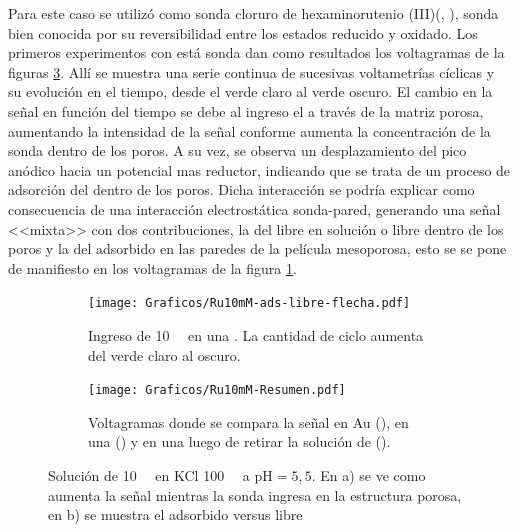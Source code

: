 		Para este caso se utilizó como sonda cloruro de hexaminorutenio (III)\linebreak (\aminorutenioCompleto, \ru), sonda bien conocida por su reversibilidad entre los estados reducido y oxidado. Los primeros experimentos con está sonda dan como resultados los voltagramas de la figuras \ref{fig:primero-Ru10mM}. Allí se muestra una serie continua de sucesivas voltametrías cíclicas y su evolución en el tiempo, desde el verde claro al verde oscuro. El cambio en la señal en función del tiempo se debe al ingreso el \ru\space a través de la matriz porosa, aumentando la intensidad de la señal conforme aumenta la concentración de la sonda dentro de los poros. A su vez, se observa un desplazamiento del pico anódico hacia un potencial mas reductor, indicando que se trata de un proceso de adsorción del \ru\space dentro de los poros. Dicha interacción se podría explicar como consecuencia de una interacción electrostática sonda-pared, generando una señal <<mixta>> con dos contribuciones, la del \ru\space libre en solución o libre dentro de los poros y la del adsorbido en las paredes de la película mesoporosa, esto se se pone de manifiesto en los voltagramas de la figura \ref{fig:Ru10mM_ingreso}.

			\begin{figure}[th]
				\begin{subfigure}[t]{0.495\textwidth}
				\texttt{[image: Graficos/Ru10mM-ads-libre-flecha.pdf]}
		        \caption{Ingreso de \ru\space \SI{10}{\milli\Molar} en una \pdmF. La cantidad de ciclo aumenta del verde claro al oscuro.}
		        \label{fig:Ru10mM_ingreso}
		      	\end{subfigure}
		      	\begin{subfigure}[t]{0.495\textwidth}
				\texttt{[image: Graficos/Ru10mM-Resumen.pdf]}
		        \caption{Voltagramas donde se compara la señal en Au (\usebox{\rojo}), en una \pdmF\space(\usebox{\verde}) y en una \pdmF\space luego de retirar la solución de \ru (\usebox{\azul}).}
		        \label{fig:Ru10mM-resumen}
		      	\end{subfigure}
		      	\caption[Adsorción de sonda positiva en \pdmF]{Solución de \ru\space \SI{10}{\milli\Molar} en KCl \SI{100}{\milli\Molar} a $\text{pH}=5,5$. En a) se ve como aumenta la señal mientras la sonda ingresa en la estructura porosa, en b) se muestra el adsorbido versus libre}
		      	\label{fig:primero-Ru10mM}
		      	\end{figure}

